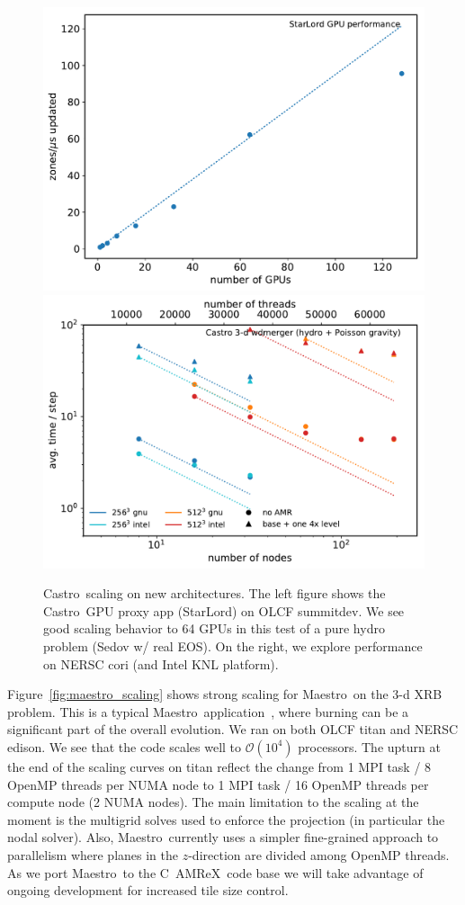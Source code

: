 \documentclass[a4paper]{jpconf}
\newcommand{\maestro}{{\sffamily Maestro}}
\newcommand{\castro}{{\sffamily Castro}}
\newcommand{\starlord}{{\sffamily StarLord}}
\newcommand{\amrex}{{\sffamily AMReX}}
\newcommand{\cpp}{C\nolinebreak\hspace{-.05em}\raisebox{.4ex}{\tiny\bf +}\nolinebreak\hspace{-.10em}\raisebox{.4ex}{\tiny\bf +}}
\begin{document}
\begin{figure}[t]
\centering
\includegraphics[width=0.48\linewidth]{summitdev_scaling}
\includegraphics[width=0.48\linewidth]{cori_scaling}
\caption{\label{fig:knl-gpu-scaling} \castro\ scaling on new
  architectures.  The left figure shows the \castro\ GPU proxy app
  (\starlord) on OLCF summitdev.  We see good scaling behavior to 64
  GPUs in this test of a pure hydro problem (Sedov w/ real EOS).  On the
right, we explore performance on NERSC cori (and Intel KNL platform).}
\end{figure}

Figure~\ref{fig:maestro_scaling} shows strong scaling for \maestro\ on
the 3-d XRB problem.  This is a typical
\maestro\ application~\cite{xrb3}, where burning can be a significant
part of the overall evolution.  We ran on both OLCF titan and NERSC
edison.  We see that the code scales well to $\mathcal{O}(10^4)$
processors.  The upturn at the end of the scaling curves on titan
reflect the change from 1 MPI task / 8 OpenMP threads per NUMA node to
1 MPI task / 16 OpenMP threads per compute node (2 NUMA nodes).  The
main limitation to the scaling at the moment is the multigrid solves
used to enforce the projection (in particular the nodal solver).
Also, \maestro\ currently uses a simpler fine-grained approach to parallelism
where planes in the $z$-direction are divided among OpenMP threads.
As we port \maestro\ to the \cpp\ \amrex\ code base we will take
advantage of ongoing development for increased tile size control.
\end{document}
